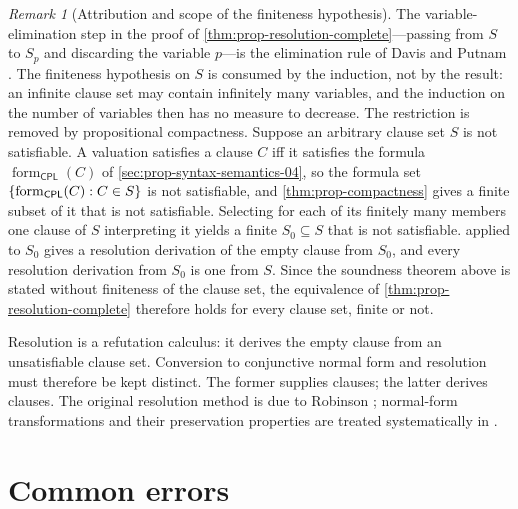 \documentclass[11pt,oneside,openany]{book}
\theoremstyle{definition}
\theoremstyle{plain}
\theoremstyle{remark}
\newtheorem{remark}[definition]{Remark}
\DeclarePairedDelimiter{\set}{\lbrace}{\rbrace}
\newcommand{\CPL}{\mathsf{CPL}}
\begin{document}
\begin{remark}[Attribution and scope of the finiteness hypothesis]
\label{rem:resolution-finiteness}
The variable-elimination step in the proof of
\cref{thm:prop-resolution-complete}---passing from \(S\) to \(S_p\) and
discarding the variable \(p\)---is the elimination rule of Davis and
Putnam \cite{DavisPutnam1960}.  The finiteness hypothesis on \(S\) is
consumed by the induction, not by the result: an infinite clause set may
contain infinitely many variables, and the induction on the number of
variables then has no measure to decrease.  The restriction is removed by
propositional compactness.  Suppose an arbitrary clause set \(S\) is not
satisfiable.  A valuation satisfies a clause \(C\) iff it satisfies the
formula \(\operatorname{form}_{\CPL}(C)\) of
\cref{sec:prop-syntax-semantics-04}, so the formula set
\(\set{\operatorname{form}_{\CPL}(C):C\in S}\) is not satisfiable, and
\cref{thm:prop-compactness} gives a finite subset of it that is not
satisfiable.  Selecting for each of its finitely many members one clause
of \(S\) interpreting it yields a finite \(S_0\subseteq S\) that is not
satisfiable.   applied to \(S_0\)
gives a resolution derivation of the empty clause from \(S_0\), and every
resolution derivation from \(S_0\) is one from \(S\).  Since the
soundness theorem above is stated without finiteness of the clause set,
the equivalence of \cref{thm:prop-resolution-complete} therefore holds
for every clause set, finite or not.
\end{remark}

Resolution is a refutation calculus: it derives the empty clause from an
unsatisfiable clause set.  Conversion to conjunctive normal form and
resolution must therefore be kept distinct.  The former supplies clauses; the
latter derives clauses.  The original resolution method is due to Robinson
\cite{Robinson1965}; normal-form transformations and their preservation
properties are treated systematically in \cite{BaazEglyLeitsch2001}.

\section{Common errors}
\label{sec:prop-metatheory-05}
\end{document}
